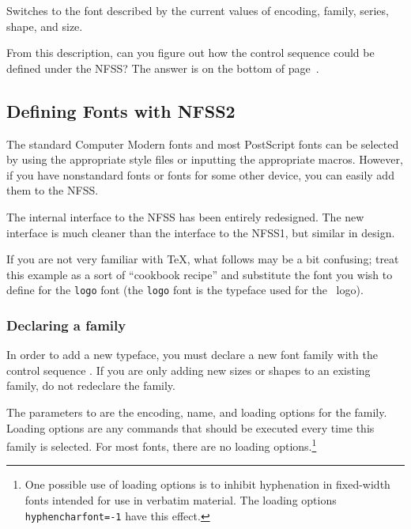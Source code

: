 \begin{iplist}[\textnormal]{.25in}

      Switches to the font described by the current values of
      encoding, family, series, shape, and size.
\end{iplist}

From this description, can you figure out how the control sequence
 could be defined under the NFSS\label{footnote:question}?  
The answer is on the bottom of page~\pageref{footnote:answer}.

\subsection{Defining Fonts with NFSS2}
\label{sec:fonts:defnfss2}

The standard Computer Modern fonts and most PostScript fonts can be
selected by using the appropriate style files or inputting the
appropriate macros.  However, if you have nonstandard fonts or fonts
for some other device, you can easily add them to the
NFSS.

The internal interface to the NFSS has been entirely redesigned.  
The new interface is much cleaner than the interface to the NFSS1, but
similar in design.

If you are not very familiar with \TeX, what follows may be a bit confusing;
treat this example as a sort of ``cookbook recipe'' and substitute the
font you wish to define for the \verb|logo| font (the
\verb|logo| font is the typeface used for the \MF\ logo).

\subsubsection{Declaring a family}

In order to add a new typeface, you must declare a new 
font family with
the control sequence 
.  If you are only adding new sizes or shapes to an
existing family, do not redeclare the family.

The parameters to  are the encoding, name, and
loading options for the family.  Loading options are any commands that
should be executed every time this family is selected.  For most fonts,
there are no loading options.\footnote{One possible use of loading
options is to inhibit hyphenation in fixed-width fonts intended for use
in verbatim material.  The loading options \texttt{\ttbackslash 
hyphenchar\ttbackslash font=-1} have this effect.}

